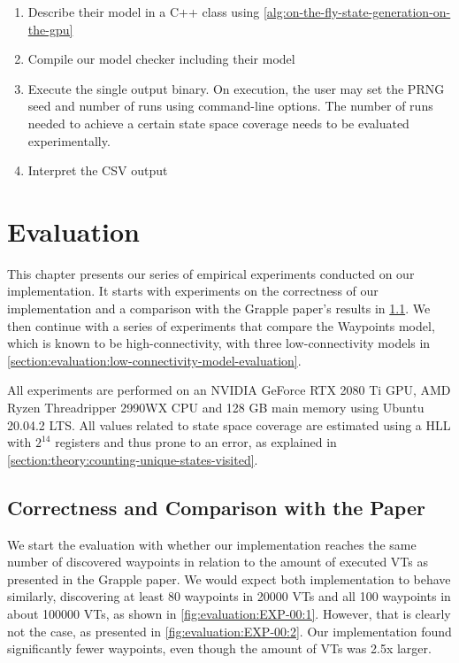\documentclass[
fancyheadings, %
%
%
]{stsreprt}
\begin{document}
\begin{enumerate}
    \item Describe their model in a C++ class using \cref{alg:on-the-fly-state-generation-on-the-gpu}
    \item Compile our model checker including their model
    \item Execute the single output binary.
          On execution, the user may set the PRNG seed and number of runs using command-line options.
          The number of runs needed to achieve a certain state space coverage needs to be evaluated experimentally.
    \item Interpret the CSV output
\end{enumerate}

\chapter{Evaluation}

This chapter presents our series of empirical experiments conducted on our implementation.
It starts with experiments on the correctness of our implementation and a comparison with the Grapple paper's results in \cref{section:evaluation:correctness-comparison-with-paper}.
We then continue with a series of experiments that compare the Waypoints model, which is known to be high-connectivity, with three low-connectivity models in \cref{section:evaluation:low-connectivity-model-evaluation}.

All experiments are performed on an NVIDIA GeForce RTX 2080 Ti GPU, AMD Ryzen Threadripper 2990WX CPU and 128 GB main memory using Ubuntu 20.04.2 LTS.
All values related to state space coverage are estimated using a HLL with $2^{14}$ registers and thus prone to an error, as explained in \cref{section:theory:counting-unique-states-visited}.

\section{Correctness and Comparison with the Paper}
\label{section:evaluation:correctness-comparison-with-paper}

We start the evaluation with whether our implementation reaches the same number of discovered waypoints in relation to the amount of executed VTs as presented in the Grapple paper.
We would expect both implementation to behave similarly, discovering at least 80 waypoints in \num{20000} VTs and all 100 waypoints in about \num{100000} VTs, as shown in \cref{fig:evaluation:EXP-00:1}.
However, that is clearly not the case, as presented in \cref{fig:evaluation:EXP-00:2}.
Our implementation found significantly fewer waypoints, even though the amount of VTs was 2.5x larger.
\end{document}
